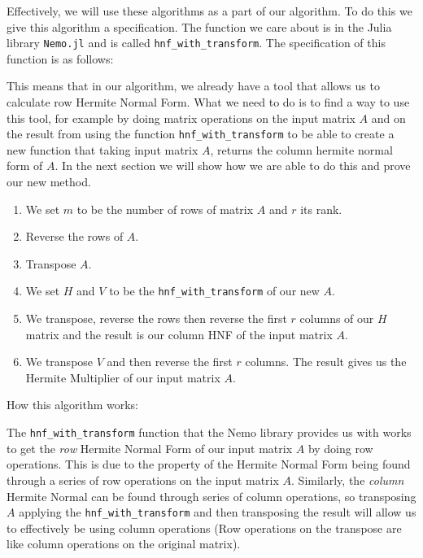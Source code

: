 \documentclass[oneside, a4paper, onecolumn, 11pt]{article}
\begin{document}
Effectively, we will use these algorithms as a part of our algorithm. To do this we give this algorithm a specification. The function we care about is in the Julia library \texttt{Nemo.jl} \cite{nemo} and is called \texttt{hnf\_with\_transform}. The specification of this function is as follows:

This means that in our algorithm, we already have a tool that allows us to calculate row Hermite Normal Form. What we need to do is to find a way to use this tool, for example by doing matrix operations on the input matrix \(A\) and on the result from using the function \texttt{hnf\_with\_transform} to be able to create a new function that taking input matrix \(A\), returns the column hermite normal form of \(A\). In the next section we will show how we are able to do this and prove our new method.


\begin{enumerate}
    \item We set \(m\) to be the number of rows of matrix \(A\) and \(r\) its rank.
    \item Reverse the rows of \(A\).
    \item Transpose \(A\).
    \item We set \(H\) and \(V\) to be the \texttt{hnf\_with\_transform} of our new \(A\).
    \item We transpose, reverse the rows then reverse the first \(r\) columns of our \(H\) matrix and the result is our column HNF of the input matrix \(A\).
    \item We transpose \(V\) and then reverse the first \(r\) columns. The result gives us the Hermite Multiplier of our input matrix \(A\).
\end{enumerate}

How this algorithm works:

The \texttt{hnf\_with\_transform} function that the Nemo library provides us with works to get the \textit{row} Hermite Normal Form of our input matrix \(A\) by doing row operations. This is due to the property of the Hermite Normal Form being found through a series of row operations on the input matrix \(A\). Similarly, the \textit{column} Hermite Normal can be found through series of column operations, so transposing \(A\) applying the \texttt{hnf\_with\_transform} and then transposing the result will allow us to effectively be using column operations (Row operations on the transpose are like column operations on the original matrix).
\end{document}
